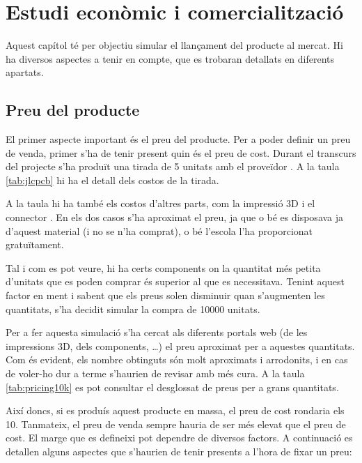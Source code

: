 \chapter{Estudi econòmic i comercialització}
\label{cap:economia}

Aquest capítol té per objectiu simular el llançament del producte al mercat.
Hi ha diversos aspectes a tenir en compte, que es trobaran detallats en
diferents apartats.

\section{Preu del producte}

El primer aspecte important és el preu del producte. Per a poder definir un
preu de venda, primer s'ha de tenir present quin és el preu de cost. Durant
el transcurs del projecte s'ha produït una tirada de 5 unitats amb el
proveïdor . A la taula \ref{tab:jlcpcb} hi ha el detall dels
costos de la tirada.



A la taula hi ha també els costos d'altres parts, com la impressió
3D i el connector . En els dos casos s'ha aproximat el preu, ja que
o bé es disposava ja d'aquest material (i no se n'ha comprat), o bé l'escola
l'ha proporcionat gratuïtament.

Tal i com es pot veure, hi ha certs components on la quantitat més petita
d'unitats que es poden comprar és superior al que es necessitava. Tenint aquest
factor en ment i sabent que els preus solen disminuir quan s'augmenten les
quantitats, s'ha decidit simular la compra de 10000 unitats.

Per a fer aquesta simulació s'ha cercat als diferents portals web (de les
impressions 3D, dels components, \dots) el preu aproximat per a aquestes
quantitats. Com és evident, els nombre obtinguts són molt aproximats i
arrodonits, i en cas de voler-ho dur a terme s'haurien de revisar amb més
cura. A la taula
\ref{tab:pricing10k} es pot consultar el desglossat de preus per a
grans quantitats.



Així doncs, si es produís aquest producte en massa, el preu de cost rondaria
els \SI[round-mode=places,round-precision=0]{10}{\EUR}.
Tanmateix, el preu de venda sempre hauria de ser més elevat que
el preu de cost. El marge que es defineixi pot dependre de diversos factors.
A continuació es detallen alguns aspectes que s'haurien de tenir presents
a l'hora de fixar un preu:

